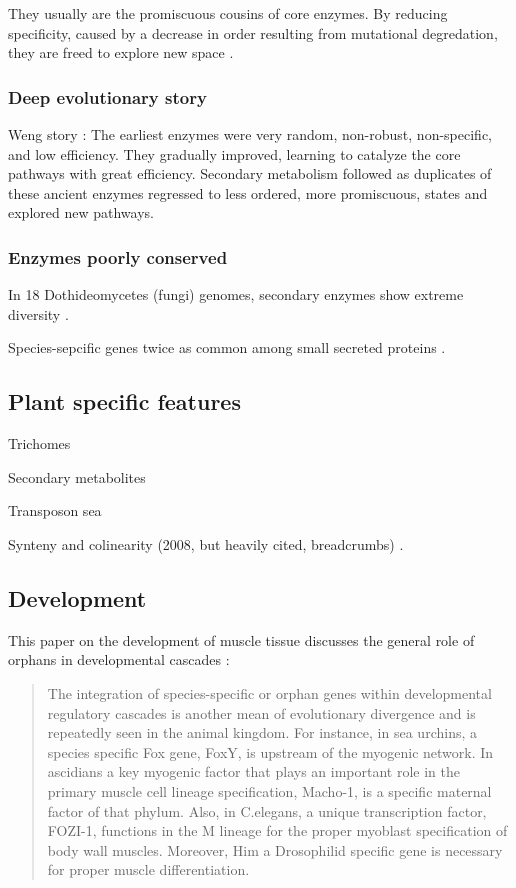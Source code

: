     They usually are the promiscuous cousins of core enzymes. By reducing
    specificity, caused by a decrease in order resulting from mutational
    degredation, they are freed to explore new space \cite[review]{weng_rise_2012}.

\subsubsection{Deep evolutionary story}

    Weng story \cite{weng_rise_2012}: The earliest enzymes were very random,
    non-robust, non-specific, and low efficiency. They gradually improved,
    learning to catalyze the core pathways with great efficiency. Secondary
    metabolism followed as duplicates of these ancient enzymes regressed to
    less ordered, more promiscuous, states and explored new pathways.

\subsubsection{Enzymes poorly conserved}

    In 18 Dothideomycetes (fungi) genomes, secondary enzymes show extreme
    diversity \cite{ohm_diverse_2012}.

    Species-sepcific genes twice as common among small secreted proteins
    \cite{ohm_diverse_2012}. 

\subsection{Plant specific features}

    Trichomes

    Secondary metabolites

    Transposon sea

    Synteny and colinearity (2008, but heavily cited, breadcrumbs)
    \cite{tang_synteny_2008}.

\subsection{Development}

  This paper on the development of muscle tissue discusses the general role of
  orphans in developmental cascades \cite{andrikou_too_2015}:

  \begin{quote}
    The integration of species-specific or orphan genes within developmental
    regulatory cascades is another mean of evolutionary divergence and is
    repeatedly seen in the animal kingdom. For instance, in sea urchins, a
    species specific Fox gene, FoxY, is upstream of the myogenic network. In
    ascidians a key myogenic factor that plays an important role in the primary
    muscle cell lineage specification, Macho-1, is a specific maternal factor of
    that phylum. Also, in C.elegans, a unique transcription factor, FOZI-1,
    functions in the M lineage for the proper myoblast specification of body wall
    muscles. Moreover, Him a Drosophilid specific gene is necessary for proper
    muscle differentiation.
  \end{quote}
